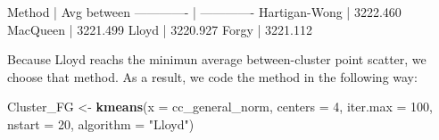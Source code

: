 \documentclass[11pt,]{article}
\newenvironment{Shaded}{\begin{snugshade}}{\end{snugshade}}
\newcommand{\KeywordTok}[1]{\textcolor[rgb]{0.13,0.29,0.53}{\textbf{#1}}}
\newcommand{\DataTypeTok}[1]{\textcolor[rgb]{0.13,0.29,0.53}{#1}}
\newcommand{\DecValTok}[1]{\textcolor[rgb]{0.00,0.00,0.81}{#1}}
\newcommand{\StringTok}[1]{\textcolor[rgb]{0.31,0.60,0.02}{#1}}
\newcommand{\CommentTok}[1]{\textcolor[rgb]{0.56,0.35,0.01}{\textit{#1}}}
\newcommand{\ControlFlowTok}[1]{\textcolor[rgb]{0.13,0.29,0.53}{\textbf{#1}}}
\newcommand{\OperatorTok}[1]{\textcolor[rgb]{0.81,0.36,0.00}{\textbf{#1}}}
\newcommand{\NormalTok}[1]{#1}
\begin{document}
\begin{Shaded}
\end{Shaded}

\begin{Shaded}
\begin{Highlighting}[]

\NormalTok{Method        | Avg between}
\NormalTok{------------- | -------------}
\NormalTok{Hartigan-Wong | 3222.460}
\NormalTok{MacQueen      | 3221.499}
\NormalTok{Lloyd         | 3220.927}
\NormalTok{Forgy         | 3221.112}
\end{Highlighting}
\end{Shaded}

Because Lloyd reachs the minimun average between-cluster point scatter,
we choose that method. As a result, we code the method in the following
way:

\begin{Shaded}
\begin{Highlighting}[]
\NormalTok{Cluster_FG <-}\StringTok{ }\KeywordTok{kmeans}\NormalTok{(}\DataTypeTok{x =}\NormalTok{ cc_general_norm,}
                     \DataTypeTok{centers =}  \DecValTok{4}\NormalTok{,}
                     \DataTypeTok{iter.max =} \DecValTok{100}\NormalTok{,}
                     \DataTypeTok{nstart =} \DecValTok{20}\NormalTok{,}
                     \DataTypeTok{algorithm =} \StringTok{"Lloyd"}\NormalTok{)}
\end{Highlighting}
\end{Shaded}
\end{document}
